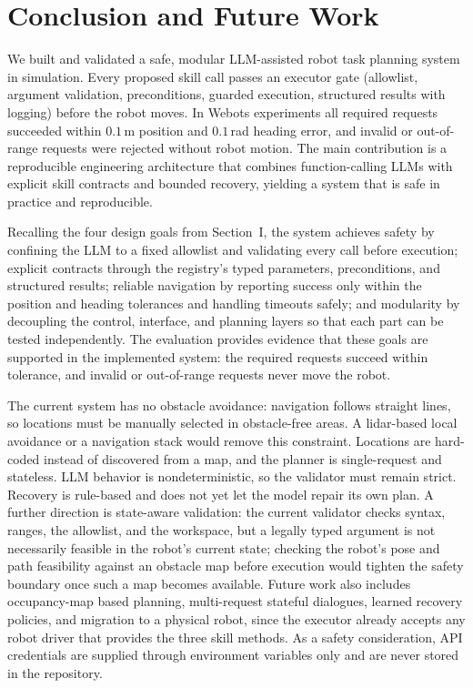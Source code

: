 \documentclass[conference]{IEEEtran}
\begin{document}
\section{Conclusion and Future Work}
We built and validated a safe, modular LLM-assisted robot task planning
system in simulation. Every proposed skill call passes an executor gate
(allowlist, argument validation, preconditions, guarded execution, structured
results with logging) before the robot moves. In Webots experiments all
required requests succeeded within $0.1$\,m position and $0.1$\,rad heading
error, and invalid or out-of-range requests were rejected without robot
motion. The main contribution is a reproducible engineering architecture
that combines function-calling LLMs with explicit skill contracts and
bounded recovery, yielding a system that is safe in practice and
reproducible.

Recalling the four design goals from Section~I, the system achieves
safety by confining the LLM to a fixed allowlist and validating every
call before execution; explicit contracts through the registry's
typed parameters, preconditions, and structured results; reliable
navigation by reporting success only within the position and heading
tolerances and handling timeouts safely; and modularity by decoupling
the control, interface, and planning layers so that each part can be tested
independently. The evaluation provides evidence that these goals are
supported in the implemented system: the required requests succeed within
tolerance, and invalid or out-of-range requests never move the robot.

The current system has no obstacle avoidance: navigation follows straight
lines, so locations must be manually selected in obstacle-free areas. A
lidar-based local avoidance or a navigation stack would remove this
constraint. Locations are hard-coded instead of discovered from a map, and
the planner is single-request and stateless. LLM behavior is nondeterministic,
so the validator must remain strict. Recovery is rule-based and does not yet
let the model repair its own plan. A further direction is state-aware
validation: the current validator checks syntax, ranges, the allowlist, and
the workspace, but a legally typed argument is not necessarily feasible in
the robot's current state; checking the robot's pose and path feasibility
against an obstacle map before execution would tighten the safety boundary
once such a map becomes available. Future work also includes
occupancy-map based planning, multi-request stateful dialogues, learned
recovery policies, and migration to a physical robot, since the executor
already accepts any robot driver that provides the three skill methods. As a
safety consideration, API credentials are supplied through environment
variables only and are never stored in the repository.
\end{document}
